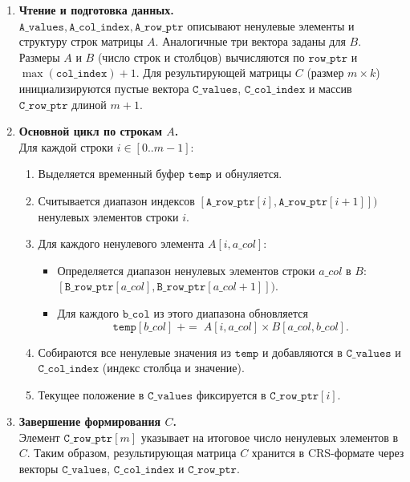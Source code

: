\documentclass[12pt]{article}
\begin{document}
\begin{enumerate}
    \item \textbf{Чтение и подготовка данных.}\\
    \(\texttt{A\_values}, \texttt{A\_col\_index}, \texttt{A\_row\_ptr}\) описывают ненулевые элементы и структуру строк матрицы \(A\). Аналогичные три вектора заданы для \(B\). Размеры \(A\) и \(B\) (число строк и столбцов) вычисляются по \(\texttt{row\_ptr}\) и \(\max(\texttt{col\_index}) + 1\). Для результирующей матрицы \(C\) (размер \(m \times k\)) инициализируются пустые вектора \(\texttt{C\_values}\), \(\texttt{C\_col\_index}\) и массив \(\texttt{C\_row\_ptr}\) длиной \(m+1\).

    \item \textbf{Основной цикл по строкам \(A\).}\\
    Для каждой строки \(i \in [0..m-1]\):
    \begin{enumerate}
        \item Выделяется временный буфер \(\texttt{temp}\) и обнуляется.
        \item Считывается диапазон индексов \([\texttt{A\_row\_ptr}[i], \texttt{A\_row\_ptr}[i+1]])\) ненулевых элементов строки \(i\).
        \item Для каждого ненулевого элемента \(A[i,a\_col]\):
        \begin{itemize}
            \item Определяется диапазон ненулевых элементов строки \(a\_col\) в \(B\): \([\texttt{B\_row\_ptr}[a\_col], \texttt{B\_row\_ptr}[a\_col + 1]])\).
            \item Для каждого \(\texttt{b\_col}\) из этого диапазона обновляется 
            \[
            \texttt{temp}[b\_col] \;{+}{=}\; A[i,a\_col] \times B[a\_col,b\_col].
            \]
        \end{itemize}
        \item Собираются все ненулевые значения из \(\texttt{temp}\) и добавляются в \(\texttt{C\_values}\) и \(\texttt{C\_col\_index}\) (индекс столбца и значение).
        \item Текущее положение в \(\texttt{C\_values}\) фиксируется в \(\texttt{C\_row\_ptr}[i]\).
    \end{enumerate}

    \item \textbf{Завершение формирования \(C\).}\\
    Элемент \(\texttt{C\_row\_ptr}[m]\) указывает на итоговое число ненулевых элементов в \(C\). Таким образом, результирующая матрица \(C\) хранится в CRS-формате через векторы \(\texttt{C\_values}\), \(\texttt{C\_col\_index}\) и \(\texttt{C\_row\_ptr}\).
\end{enumerate}
\end{document}
